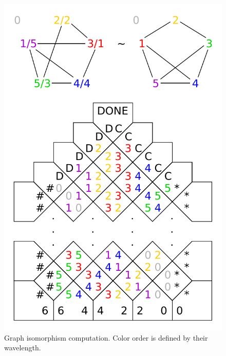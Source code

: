 
\begin{figure}[H]
\begin{center}
	\includegraphics[scale=0.75]{./figures/isomorphism/isomorphism.pdf}
	\caption{Graph isomorphism computation. Color order is defined by their wavelength.}
	\label{fig:graph_iso}
\end{center}
\end{figure}
